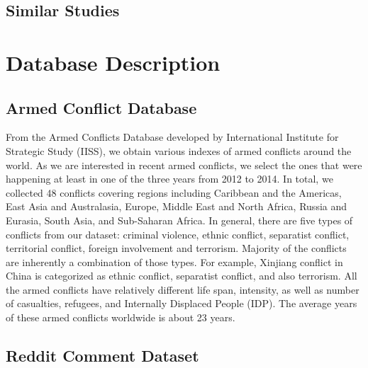 \subsection{Similar Studies}



\section{Database Description}
\subsection{Armed Conflict Database}
From the Armed Conflicts Database developed by International Institute for Strategic Study (IISS), we obtain various indexes of armed conflicts around the world. As we are interested in recent armed conflicts, we select the ones that were happening at least in one of the three years from 2012 to 2014. In total, we collected 48 conflicts covering regions including Caribbean and the Americas, East Asia and Australasia, Europe, Middle East and North Africa, Russia and Eurasia, South Asia, and Sub-Saharan Africa. In general, there are five types of conflicts from our dataset: criminal violence, ethnic conflict, separatist conflict, territorial conflict, foreign involvement and terrorism. Majority of the conflicts are inherently a combination of those types. For example, Xinjiang conflict in China is categorized as ethnic conflict, separatist conflict, and also terrorism. All the armed conflicts have relatively different life span, intensity, as well as number of casualties, refugees, and Internally Displaced People (IDP). The average years of these armed conflicts worldwide is about 23 years.

\subsection{Reddit Comment Dataset}



